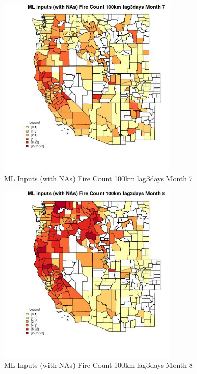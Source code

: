 \begin{figure} 
\centering  
\includegraphics[width=0.77\textwidth]{Code_Outputs/Report_ML_input_PM25_Step4_part_f_de_duplicated_aves_prioritize_24hr_obswNAs_CountyFire_Count_100km_lag3daysmedianMonth7.jpg} 
\caption{\label{fig:Report_ML_input_PM25_Step4_part_f_de_duplicated_aves_prioritize_24hr_obswNAsCountyFire_Count_100km_lag3daysmedianMonth7}ML Inputs (with NAs) Fire Count 100km lag3days Month 7} 
\end{figure} 
 

\begin{figure} 
\centering  
\includegraphics[width=0.77\textwidth]{Code_Outputs/Report_ML_input_PM25_Step4_part_f_de_duplicated_aves_prioritize_24hr_obswNAs_CountyFire_Count_100km_lag3daysmedianMonth8.jpg} 
\caption{\label{fig:Report_ML_input_PM25_Step4_part_f_de_duplicated_aves_prioritize_24hr_obswNAsCountyFire_Count_100km_lag3daysmedianMonth8}ML Inputs (with NAs) Fire Count 100km lag3days Month 8} 
\end{figure} 
 

